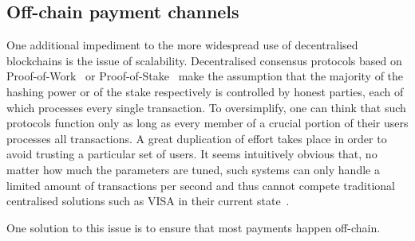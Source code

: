 \subsection{Off-chain payment channels}
  One additional impediment to the more widespread use of decentralised blockchains is the
  issue of scalability. Decentralised consensus protocols based on
  Proof-of-Work~\cite{hashcash} or Proof-of-Stake~\cite{ouroboros} make the assumption
  that the majority of the hashing power or of the stake respectively is controlled by
  honest parties, each of which processes every single transaction. To oversimplify, one
  can think that such protocols function only as long as every member of a crucial portion
  of their users processes all transactions. A great duplication of effort takes place in
  order to avoid trusting a particular set of users. It seems intuitively obvious that, no
  matter how much the parameters are tuned, such systems can only handle a limited amount
  of transactions per second and thus cannot compete traditional centralised solutions
  such as VISA in their current state~\cite{tps}.

  One solution to this issue is to ensure that most payments happen off-chain.
